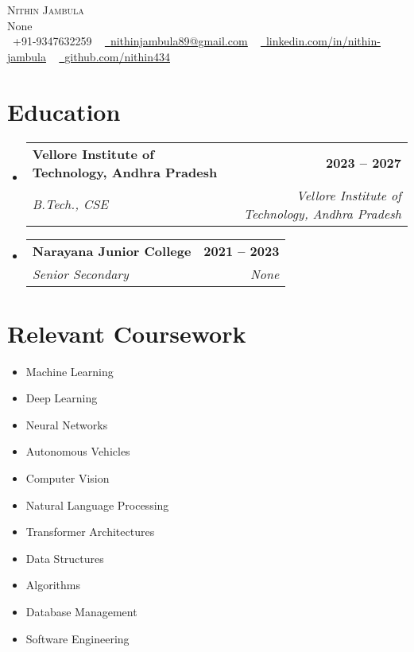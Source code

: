 \documentclass[letterpaper,11pt]{article}
\makeatletter
\newcommand{\resumeSubheading}[4]{
  \vspace{-2pt}\item
    \begin{tabular*}{1.0\textwidth}[t]{l@{\extracolsep{\fill}}r}
      \textbf{#1} & \textbf{\small #2} \\
      \textit{\small#3} & \textit{\small #4} \\
    \end{tabular*}\vspace{-7pt}
}
\newcommand{\resumeSubHeadingListStart}{\begin{itemize}[leftmargin=0.0in, label={}]}
\newcommand{\resumeSubHeadingListEnd}{\end{itemize}}
\makeatother
\begin{document}
\begin{center}
    {\Huge \scshape Nithin Jambula} \\ \vspace{1pt}
    None \\ \vspace{1pt}
    \small \raisebox{-0.1\height}\faPhone\ +91-9347632259 ~ \href{mailto:nithinjambula89@gmail.com}{\raisebox{-0.2\height}\faEnvelope\  \underline{nithinjambula89@gmail.com}} ~ 
    \href{linkedin.com/in/nithin-jambula}{\raisebox{-0.2\height}\faLinkedin\ \underline{linkedin.com/in/nithin-jambula}}  ~
    \href{github.com/nithin434}{\raisebox{-0.2\height}\faGithub\ \underline{github.com/nithin434}}
    \vspace{-8pt}
\end{center}

\section{Education}
  \resumeSubHeadingListStart
    \resumeSubheading
      {Vellore Institute of Technology, Andhra Pradesh}{2023 -- 2027}
      {B.Tech., CSE}{Vellore Institute of Technology, Andhra Pradesh}
    \resumeSubheading
      {Narayana Junior College}{2021 -- 2023}
      {Senior Secondary}{None}
  \resumeSubHeadingListEnd



\section{Relevant Coursework}
    \begin{multicols}{4}
        \begin{itemize}[itemsep=-5pt, parsep=3pt]
            \item\small Machine Learning
            \item\small Deep Learning
            \item\small Neural Networks
            \item\small Autonomous Vehicles
            \item\small Computer Vision
            \item\small Natural Language Processing
            \item\small Transformer Architectures
            \item\small Data Structures
            \item\small Algorithms
            \item\small Database Management
            \item\small Software Engineering
        \end{itemize}
    \end{multicols}
    \vspace*{2.0\multicolsep}
\end{document}
